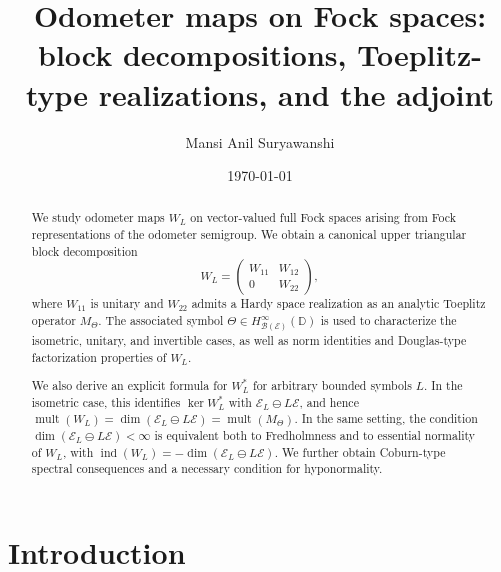 \documentclass[12pt]{amsart}
\theoremstyle{definition}
\theoremstyle{remark}
\numberwithin{equation}{section}
\begin{document}
\title[Odometer maps on Fock spaces]{Odometer maps on Fock spaces: block decompositions, Toeplitz-type realizations, and the adjoint}
\author{Mansi Anil Suryawanshi}
\address{Department of Mathematics, Technion—Israel Institute of Technology, Haifa 32000, Israel.}

\date{\today}


\maketitle	


\begin{abstract}
We study odometer maps $W_L$ on vector-valued full Fock spaces arising from Fock representations of the odometer semigroup. We obtain a canonical upper triangular block decomposition
\[
W_L=
\begin{pmatrix}
W_{11} & W_{12}\\
0 & W_{22}
\end{pmatrix},
\]
where $W_{11}$ is unitary and $W_{22}$ admits a Hardy space realization as an analytic Toeplitz operator $M_\Theta$. The associated symbol $\Theta\in H^\infty_{\mathcal{B}(\mathcal{E})}(\mathbb{D})$ is used to characterize the isometric, unitary, and invertible cases, as well as norm identities and Douglas-type factorization properties of $W_L$.

We also derive an explicit formula for $W_L^*$ for arbitrary bounded symbols $L$. In the isometric case, this identifies $\ker W_L^*$ with $\mathcal{E}_L\ominus L\mathcal{E}$, and hence $\operatorname{mult}(W_L)=\dim(\mathcal{E}_L\ominus L\mathcal{E})=\operatorname{mult}(M_\Theta)$. In the same setting, the condition $\dim(\mathcal{E}_L\ominus L\mathcal{E})<\infty$ is equivalent both to Fredholmness and to essential normality of $W_L$, with $\operatorname{ind}(W_L)=-\dim(\mathcal{E}_L\ominus L\mathcal{E})$. We further obtain Coburn-type spectral consequences and a necessary condition for hyponormality.
\end{abstract}
















\section{Introduction}
\end{document}
